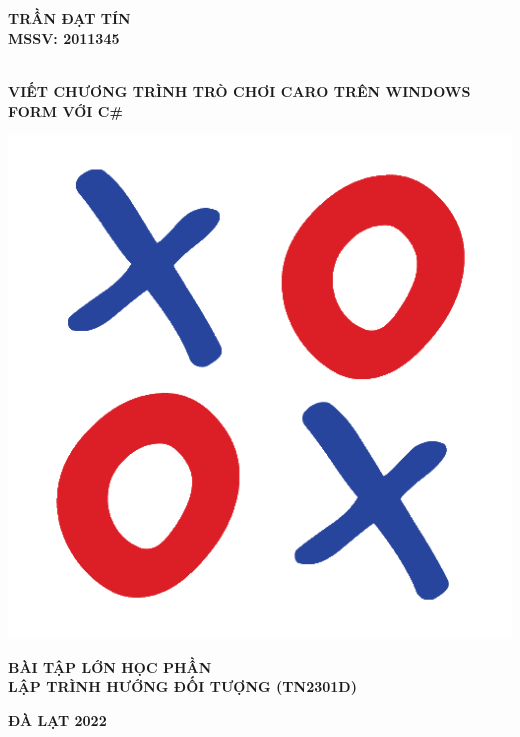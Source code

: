 \begin{titlepage}
	\thisfancypage{\setlength{\fboxsep}{0cm}\setlength{\fboxrule}{2pt}\doublebox}{}
	\thispagestyle{empty}
	\begin{center}
	\\
	\\
	[3.5cm]
	
	
	\begin{large}
	{\fontsize{15pt}{1}\selectfont  \textbf{TRẦN ĐẠT TÍN}}\\
	{\fontsize{15pt}{1}\selectfont  \textbf{MSSV: 2011345}}
	\end{large} \\
	[3cm]
	
	{\fontsize{18pt}{1}\selectfont \Large\bf VIẾT CHƯƠNG TRÌNH TRÒ CHƠI CARO TRÊN WINDOWS FORM VỚI C\#}\\[1cm]
	\begin{center}
		\includegraphics[scale=.20]{image/avtatar.png}\\[1cm]
	\end{center}
	{\fontsize{15pt}{1}\selectfont  \textbf{BÀI TẬP LỚN HỌC PHẦN\\ LẬP TRÌNH HƯỚNG ĐỐI TƯỢNG (TN2301D)}}\\
	
	\end{center}
	
	
	\vfill
	\begin{center}
	{\fontsize{12pt}{1}\selectfont \textbf{\textbf{ĐÀ LẠT 2022}}}\\
	
	\end{center}
	\end{titlepage}